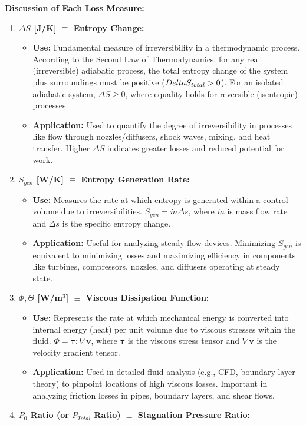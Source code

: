 \textbf{Discussion of Each Loss Measure:}

\begin{enumerate}
\def\labelenumi{\arabic{enumi}.}
\item
  \textbf{\(\Delta S\) {[}J/K{]} \(\equiv\) Entropy Change:}

  \begin{itemize}
  \tightlist
  \item
    \textbf{Use:} Fundamental measure of irreversibility in a
    thermodynamic process. According to the Second Law of
    Thermodynamics, for any real (irreversible) adiabatic process, the
    total entropy change of the system plus surroundings must be
    positive (\(\\Delta S_{total} > 0\)). For an isolated adiabatic
    system, \(\Delta S \ge 0\), where equality holds for reversible
    (isentropic) processes.
  \item
    \textbf{Application:} Used to quantify the degree of irreversibility
    in processes like flow through nozzles/diffusers, shock waves,
    mixing, and heat transfer. Higher \(\Delta S\) indicates greater
    losses and reduced potential for work.
  \end{itemize}
\item
  \textbf{\(S_{gen}\) {[}W/K{]} \(\equiv\) Entropy Generation Rate:}

  \begin{itemize}
  \tightlist
  \item
    \textbf{Use:} Measures the rate at which entropy is generated within
    a control volume due to irreversibilities.
    \(S_{gen} = \dot{m} \Delta s\), where \(\dot{m}\) is mass flow rate
    and \(\Delta s\) is the specific entropy change.
  \item
    \textbf{Application:} Useful for analyzing steady-flow devices.
    Minimizing \(S_{gen}\) is equivalent to minimizing losses and
    maximizing efficiency in components like turbines, compressors,
    nozzles, and diffusers operating at steady state.
  \end{itemize}
\item
  \textbf{\(\Phi, \Theta\) {[}W/m\(^3\){]} \(\equiv\) Viscous
  Dissipation Function:}

  \begin{itemize}
  \tightlist
  \item
    \textbf{Use:} Represents the rate at which mechanical energy is
    converted into internal energy (heat) per unit volume due to viscous
    stresses within the fluid.
    \(\Phi = \boldsymbol{\tau} : \nabla \mathbf{v}\), where
    \(\boldsymbol{\tau}\) is the viscous stress tensor and
    \(\nabla \mathbf{v}\) is the velocity gradient tensor.
  \item
    \textbf{Application:} Used in detailed fluid analysis (e.g., CFD,
    boundary layer theory) to pinpoint locations of high viscous losses.
    Important in analyzing friction losses in pipes, boundary layers,
    and shear flows.
  \end{itemize}
\item
  \textbf{\(P_0\) Ratio (or \(P_{Total}\) Ratio) \(\equiv\) Stagnation
  Pressure Ratio:}


\end{enumerate}
